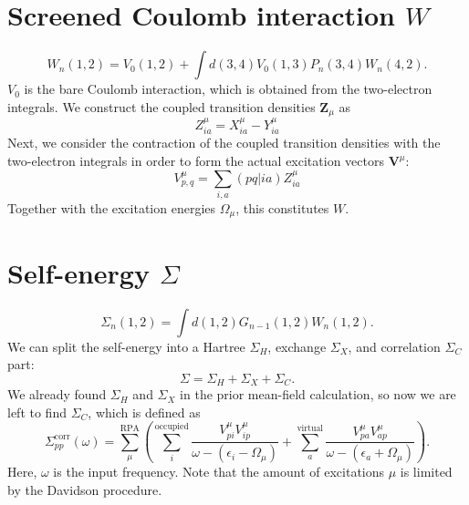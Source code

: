 \documentclass[12pt]{article}
\begin{document}
\section{Screened Coulomb interaction $W$}
\begin{equation}
    W_n(1,2)=V_0(1,2)+\int d(3,4) V_0(1,3) P_n(3,4) W_n(4,2).
\end{equation}
$V_0$ is the bare Coulomb interaction, which is obtained from the two-electron integrals.
We construct the coupled transition densities $\textbf{Z}_{\mu}$ as
\begin{equation}
    {Z}_{ia}^{\mu} = {X}_{ia}^{\mu} - {Y}_{ia}^{\mu}
\end{equation}
Next, we consider the contraction of the coupled transition densities with the two-electron integrals in order to form the actual excitation vectors $\textbf{V}^{\mu}$:
\begin{equation}
    {V}_{p,q}^{\mu} = \sum _{i,a}(pq|ia) Z_{ia}^{\mu}
\end{equation}
Together with the excitation energies $\Omega_{\mu}$, this constitutes $W$.
\section{Self-energy $\Sigma$}
\begin{equation}
    \Sigma_n(1,2)=\int d(1,2) G_{n-1}(1,2) W_n(1,2).
\end{equation}
We can split the self-energy into a Hartree $\Sigma _H$, exchange $\Sigma _X$, and correlation $\Sigma _C$ part:
\begin{equation}
    \Sigma = \Sigma _H + \Sigma _X + \Sigma _C.
\end{equation}
We already found $\Sigma _H$ and $\Sigma _X$ in the prior mean-field calculation, so now we are left to find $\Sigma _C$, which is defined as
\begin{equation}
    \Sigma_{pp}^{\text{corr}}(\omega) = \sum_{\mu }^{\text{RPA}}\left(\sum_{i}^{\text{occupied}} \frac{V_{pi}^{\mu }V_{ip}^{\mu }}{\omega -(\epsilon _{i}-\Omega  _{\mu })}+ \sum_{a}^{\text{virtual}} \frac{V_{pa}^{\mu }V_{ap}^{\mu }}{\omega -(\epsilon _{a}+\Omega  _{\mu })}\right).
\end{equation}
Here, $\omega$ is the input frequency. Note that the amount of excitations $\mu$ is limited by the Davidson procedure.
\end{document}
